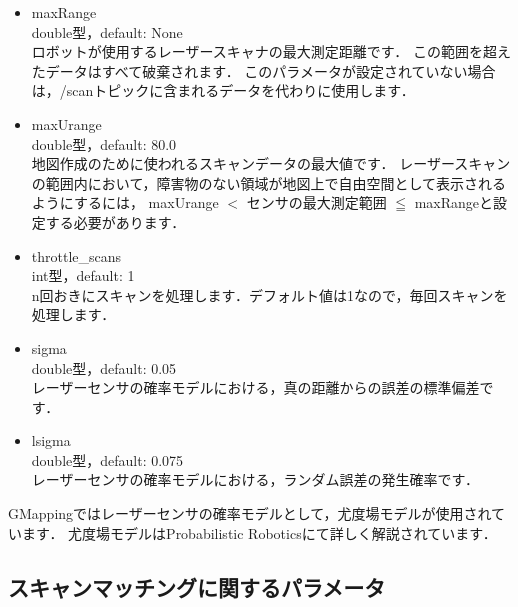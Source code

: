 \documentclass[{../../master}]{subfiles}
\begin{document}
\begin{itemize}
  \item \textsf{maxRange} \\
    double型，default: None\\
    ロボットが使用するレーザースキャナの最大測定距離です．
    この範囲を超えたデータはすべて破棄されます．
    このパラメータが設定されていない場合は，\textsf{/scan}トピックに含まれるデータを代わりに使用します．
  \item \textsf{maxUrange} \\
    double型，default: 80.0 \\
    地図作成のために使われるスキャンデータの最大値です．
    レーザースキャンの範囲内において，障害物のない領域が地図上で自由空間として表示されるようにするには，
    \textsf{maxUrange} $<$ センサの最大測定範囲 $\leqq$ \textsf{maxRange}と設定する必要があります．
  \item \textsf{throttle\_scans} \\
    int型，default: 1 \\
    n回おきにスキャンを処理します．デフォルト値は1なので，毎回スキャンを処理します．
  \item \textsf{sigma} \\
    double型，default: 0.05 \\
    レーザーセンサの確率モデルにおける，真の距離からの誤差の標準偏差です．
  \item \textsf{lsigma} \\
    double型，default: 0.075 \\
    レーザーセンサの確率モデルにおける，ランダム誤差の発生確率です．
\end{itemize}

GMappingではレーザーセンサの確率モデルとして，尤度場モデルが使用されています．
尤度場モデルはProbabilistic Robotics\cite{thrun2005probabilistic}にて詳しく解説されています．

\subsection{スキャンマッチングに関するパラメータ}
\end{document}

